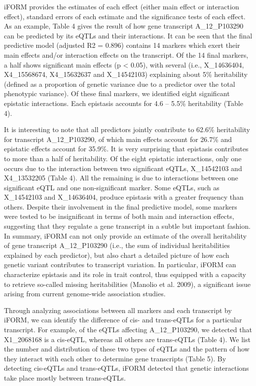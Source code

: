 \documentclass[]{book}
\theoremstyle{definition}
\theoremstyle{definition}
\theoremstyle{remark}
\begin{document}
iFORM provides the estimates of each effect (either main effect or
interaction effect), standard errors of each estimate and the
significance tests of each effect. As an example, Table 4 gives the
result of how gene transcript A\_12\_P103290 can be predicted by its
eQTLs and their interactions. It can be seen that the final predictive
model (adjusted R2 = 0.896) contains 14 markers which exert their main
effects and/or interaction effects on the transcript. Of the 14 final
markers, a half shows significant main effects (p \textless{} 0.05),
with several (i.e., X\_14636404, X4\_15568674, X4\_15632637 and
X\_14542103) explaining about 5\% heritability (defined as a proportion
of genetic variance due to a predictor over the total phenotypic
variance). Of these final markers, we identified eight significant
epistatic interactions. Each epistasis accounts for 4.6 -- 5.5\%
heritability (Table 4).

It is interesting to note that all predictors jointly contribute to
62.6\% heritability for transcript A\_12\_P103290, of which main effects
account for 26.7\% and epistatic effects account for 35.9\%. It is very
surprising that epistasis contributes to more than a half of
heritability. Of the eight epistatic interactions, only one occurs due
to the interaction between two significant eQTLs, X\_14542103 and
X4\_13532205 (Table 4). All the remaining is due to interactions between
one significant eQTL and one non-significant marker. Some eQTLs, such as
X\_14542103 and X\_14636404, produce epistasis with a greater frequency
than others. Despite their involvement in the final predictive model,
some markers were tested to be insignificant in terms of both main and
interaction effects, suggesting that they regulate a gene transcript in
a subtle but important fashion. In summary, iFORM can not only provide
an estimate of the overall heritability of gene transcript
A\_12\_P103290 (i.e., the sum of individual heritabilities explained by
each predictor), but also chart a detailed picture of how each genetic
variant contributes to transcript variation. In particular, iFORM can
characterize epistasis and its role in trait control, thus equipped with
a capacity to retrieve so-called missing heritabilities (Manolio et al.
2009), a significant issue arising from current genome-wide association
studies.

Through analyzing associations between all markers and each transcript
by iFORM, we can identify the difference of cis- and trans-eQTLs for a
particular transcript. For example, of the eQTLs affecting
A\_12\_P103290, we detected that X1\_2068168 is a cis-eQTL, whereas all
others are trans-eQTLs (Table 4). We list the number and distribution of
these two types of eQTLs and the pattern of how they interact with each
other to determine gene transcripts (Table 5). By detecting cis-eQTLs
and trans-eQTLs, iFORM detected that genetic interactions take place
mostly between trans-eQTLs.
\end{document}

